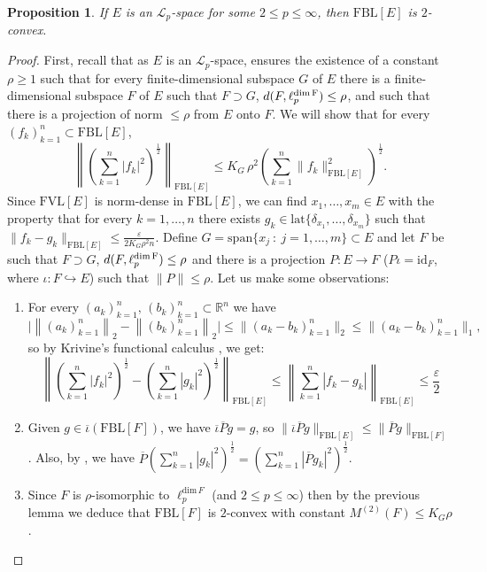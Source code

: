 \documentclass[11pt]{amsart}
\newtheorem{prop}[thm]{Proposition}
\theoremstyle{definition}
\numberwithin{equation}{section}
\newcommand{\fbl}{\text{FBL}}
\newcommand{\fvl}{\text{FVL}}
\begin{document}
\begin{prop}\label{prop:fbl[linfty]2convex}
If $E$ is an $\mathcal{L}_p$-space for some $2\leq p\leq\infty$, then $\fbl[E]$ is $2$-convex.    
\end{prop}
\begin{proof}
 First, recall that as $E$ is an $\mathcal{L}_p$-space, \cite[Theorem III (c)]{LR69} ensures the existence of a constant $\rho\geq 1$ such that for every finite-dimensional subspace $G$ of $E$ there is a finite-dimensional subspace $F$ of $E$ such that $F\supset G$, $d(F,\ell_p^{\text{dim\,F}})\leq \rho$, and such that there is a projection of norm $\leq \rho$ from $E$ onto $F$. We will show that for every $(f_k)_{k=1}^n\subset \fbl[E]$,
 $$
 \left\|\left(\sum_{k=1}^n |f_k|^2 \right)^\frac{1}{2} \right\|_{\fbl[E]}\leq K_G\,\rho^2\left(\sum_{k=1}^n \|f_k\|_{\fbl[E]}^2\right)^{\frac{1}{2}}.
 $$
Since $\fvl[E]$ is norm-dense in $\fbl[E]$, we can find $x_1,\ldots, x_m\in E$ with the property that for every $k=1,\ldots,n$ there exists $g_k\in \text{lat}\{\delta_{x_1},\ldots,\delta_{x_m}\}$ such that $\|f_k-g_k\|_{\fbl[E]}\leq \frac{\varepsilon}{2K_G\rho^2 n}$. Define $G=\text{span}\{x_j\::\: j=1,\ldots, m\}\subset E$ and let $F$ be such that $F\supset G$, $d(F,\ell_p^{\text{dim\,F}})\leq \rho$ and there is a projection $P:E\to F$ ($P\iota=\text{id}_F$, where $\iota:F\hookrightarrow E$) such that $\|P\|\leq \rho$. Let us make some observations:
\begin{enumerate}
    \item For every $(a_k)_{k=1}^n,\,(b_k)_{k=1}^n\subset \mathbb{R}^n$ we have $$
    \bigl|\left\|(a_k)_{k=1}^n\right\|_2-\left\|(b_k)_{k=1}^n\right\|_2\bigr|\leq \bigl\|(a_k-b_k)_{k=1}^n\bigr\|_2\leq \bigl\|(a_k-b_k)_{k=1}^n\bigr\|_1,
    $$
    so by Krivine's functional calculus \cite[Theorem 1.d.1]{LT2-book}, we get:
    $$
     \left\|\left(\sum_{k=1}^n |f_k|^2 \right)^\frac{1}{2} -\left(\sum_{k=1}^n |g_k|^2 \right)^\frac{1}{2} \right\|_{\fbl[E]}\leq \left\|\sum_{k=1}^n |f_k-g_k|\right\|_{\fbl[E]}\leq \frac{\varepsilon}{2}
     $$
     \item Given $g\in \overline{\iota}(\fbl[F])$, we have $\overline{\iota}\overline{P}g=g$, so  $\|\overline{\iota}\overline{P}g\|_{\fbl[E]}\leq \|\overline{P}g\|_{\fbl[F]}$. Also, by \cite[Lemma 2.1]{JLTTT}, we have $\overline{P}\left(\sum_{k=1}^n |g_k|^2 \right)^\frac{1}{2}=\left(\sum_{k=1}^n |\overline{P}g_k|^2 \right)^\frac{1}{2}$.
     \item Since $F$ is $\rho$-isomorphic to $\ell_p^{\text{dim}\,F}$ (and $2\leq p\leq\infty$) then by the previous lemma we deduce that $\fbl[F]$ is $2$-convex with constant $M^{(2)}(F)\leq K_G\rho$.
\end{enumerate}


\end{proof}
\end{document}
